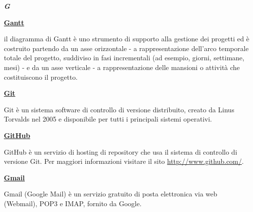 \cleardoublepage
{}
{}
\noindent\hrulefill\hspace{4mm}\textbf{\textsl{\Huge{G}}}\hspace{4mm}\hrulefill

\vspace*{2\bigskipamount}

\begin{addmargin}[0em]{0em}	
	\textbf{\underline{Gantt}} 
\end{addmargin}

\medskip
\begin{addmargin}[5em]{1em}	
il diagramma di Gantt è uno strumento di supporto alla gestione dei progetti ed è costruito partendo da un asse orizzontale - a rappresentazione dell'arco temporale totale del progetto, suddiviso in fasi incrementali (ad esempio, giorni, settimane, mesi) - e da un asse verticale - a rappresentazione delle mansioni o attività che costituiscono il progetto. 
\end{addmargin}	

\bigskip
\begin{addmargin}[0em]{0em}	
	\textbf{\underline{Git}}
\end{addmargin}

\medskip
\begin{addmargin}[5em]{1em}	
Git è un sistema software di controllo di versione distribuito, creato da Linus Torvalds nel 2005 e disponibile per tutti i principali sistemi operativi.
\end{addmargin}

\bigskip
\begin{addmargin}[0em]{0em}	
	\textbf{\underline{GitHub}}
\end{addmargin}

\medskip
\begin{addmargin}[5em]{1em}	
GitHub è un servizio di hosting di repository che usa il sistema di controllo di versione Git.
Per maggiori informazioni visitare il sito \url{http://www.github.com/}.
\end{addmargin}

\bigskip
\begin{addmargin}[0em]{0em}	
	\textbf{\underline{Gmail}}
\end{addmargin}

\medskip
\begin{addmargin}[5em]{1em}	
Gmail (Google Mail) è un servizio gratuito di posta elettronica via web (Webmail), POP3 e IMAP, fornito da Google.
\end{addmargin}	

